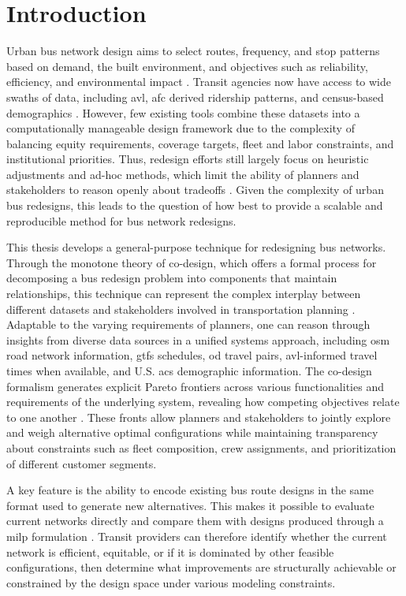 \chapter{Introduction}
\label{ch:intro}

Urban bus network design aims to select routes, frequency, and stop patterns based on demand, the built environment, and objectives such as reliability, efficiency, and environmental impact \cite{cederBusNetworkDesign1986}. Transit agencies now have access to wide swaths of data, including \gls{avl}, \gls{afc} derived ridership patterns, and census-based demographics \cite{nchrp08-119General, bertsimasOptimizingSchoolsStart2019}. However, few existing tools combine these datasets into a computationally manageable design framework due to the complexity of balancing equity requirements, coverage targets, fleet and labor constraints, and institutional priorities. Thus, redesign efforts still largely focus on heuristic adjustments and ad-hoc methods, which limit the ability of planners and stakeholders to reason openly about tradeoffs \cite{sussmanNewApproachTransportation2005}. Given the complexity of urban bus redesigns, this leads to the question of how best to provide a scalable and reproducible method for bus network redesigns.

This thesis develops a general-purpose technique for redesigning bus networks. Through the monotone theory of co-design, which offers a formal process for decomposing a bus redesign problem into components that maintain relationships, this technique can represent the complex interplay between different datasets and stakeholders involved in transportation planning \cite{censi2016Mathematical, fong2018Seven}. Adaptable to the varying requirements of planners, one can reason through insights from diverse data sources in a unified systems approach, including \gls{osm} road network information, \gls{gtfs} schedules, \gls{od} travel pairs, \gls{avl}-informed travel times when available, and U.S. \gls{acs} demographic information. The co-design formalism generates explicit Pareto frontiers across various functionalities and requirements of the underlying system, revealing how competing objectives relate to one another \cite{zardiniCoDesignEnableUserFriendly2023}. These fronts allow planners and stakeholders to jointly explore and weigh alternative optimal configurations while maintaining transparency about constraints such as fleet composition, crew assignments, and prioritization of different customer segments.

A key feature is the ability to encode existing bus route designs in the same format used to generate new alternatives. This makes it possible to evaluate current networks directly and compare them with designs produced through a \gls{milp} formulation \cite{patzoldLookAheadApproachesIntegrated2017}. Transit providers can therefore identify whether the current network is efficient, equitable, or if it is dominated by other feasible configurations, then determine what improvements are structurally achievable or constrained by the design space under various modeling constraints.

